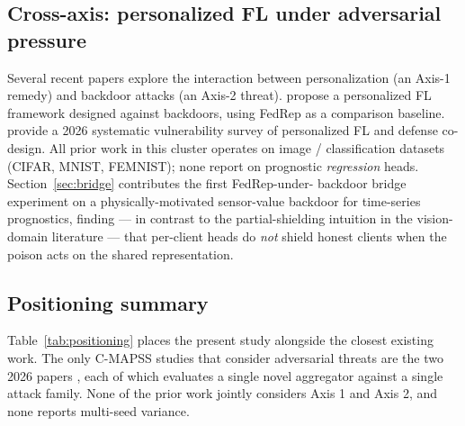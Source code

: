\documentclass[preprint,12pt,authoryear]{elsarticle}
\begin{document}
\subsection{Cross-axis: personalized FL under adversarial pressure}
\label{subsec:related-crossaxis}

Several recent papers explore the interaction between
personalization (an Axis-1 remedy) and backdoor attacks (an
Axis-2 threat). \citet{Zhang2024SARS} propose a personalized FL
framework designed against backdoors, using FedRep as a
comparison baseline. \citet{Fan2026RobustPFL} provide a 2026
systematic vulnerability survey of personalized FL and
defense co-design. All prior work in this cluster operates on
image / classification datasets (CIFAR, MNIST, FEMNIST); none
report on prognostic \emph{regression} heads.
Section~\ref{sec:bridge} contributes the first FedRep-under-
backdoor bridge experiment on a physically-motivated
sensor-value backdoor for time-series prognostics, finding ---
in contrast to the partial-shielding intuition in the
vision-domain literature --- that per-client heads do \emph{not}
shield honest clients when the poison acts on the shared
representation.

\subsection{Positioning summary}
\label{subsec:related-positioning}

Table~\ref{tab:positioning} places the present study alongside
the closest existing work. The only C-MAPSS studies that
consider adversarial threats are the two 2026 papers
\citep{Tallat2026BioMutFedPlus, Li2026TrustworthyFLIIoT}, each
of which evaluates a single novel aggregator against a single
attack family. None of the prior work jointly considers Axis 1
and Axis 2, and none reports multi-seed variance.
\end{document}
